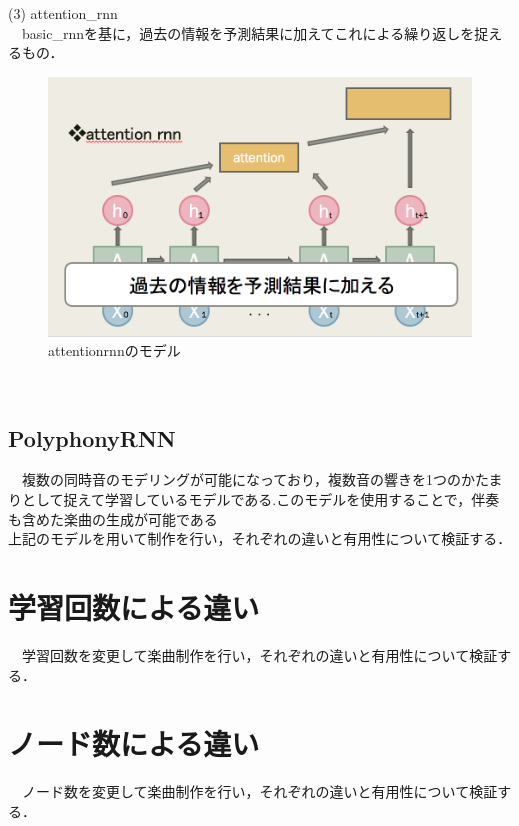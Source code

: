 \newpage
(3) attention\_rnn\\
　basic\_rnnを基に，過去の情報を予測結果に加えてこれによる繰り返しを捉えるもの．\\
\begin{figure}[!ht]
    \begin{screen}
    \begin{center}
        \includegraphics[scale=0.8, clip]{./img/attention1.png}
        \caption{attentionrnnのモデル}
        \label{fig:attentionrnnのモデル}
    \end{center}
    \end{screen}
\end{figure}\\
\subsection{PolyphonyRNN}
　複数の同時音のモデリングが可能になっており，複数音の響きを1つのかたまりとして捉えて学習しているモデルである.このモデルを使用することで，伴奏も含めた楽曲の生成が可能である\\
上記のモデルを用いて制作を行い，それぞれの違いと有用性について検証する．
\section{学習回数による違い}
　学習回数を変更して楽曲制作を行い，それぞれの違いと有用性について検証する．
\section{ノード数による違い}
　ノード数を変更して楽曲制作を行い，それぞれの違いと有用性について検証する．